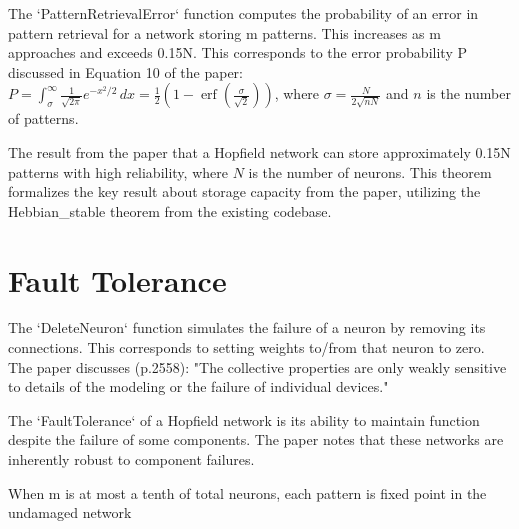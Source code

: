 \begin{definition}\label{PatternRetrievalError}
\leanok
The `PatternRetrievalError` function computes the probability of an error in pattern retrieval
for a network storing m patterns. This increases as m approaches and exceeds 0.15N.
This corresponds to the error probability P discussed in Equation 10 of the paper:
\( P = \int_{\sigma}^{\infty} \frac{1}{\sqrt{2\pi}} e^{-x^2 / 2} \, 
dx = \frac{1}{2} \left(1 - \operatorname{erf}\left(\frac{\sigma}{\sqrt{2}}\right)\right) \),
 where \( \sigma = \frac{N}{2\sqrt{nN}} \) and \( n \) is the number of patterns.

\end{definition}

\begin{theorem}\label{storage_capacity_bound}
\leanok
The result from the paper that a Hopfield network can store approximately 0.15N patterns
with high reliability, where $N$ is the number of neurons. This theorem formalizes the
 key result about storage capacity from the paper,
utilizing the Hebbian\_stable theorem from the existing codebase.
\end{theorem}


\section{Fault Tolerance}

\begin{definition}\label{DeleteNeuron}
\leanok
The `DeleteNeuron` function simulates the failure of a neuron by removing its connections.
This corresponds to setting weights to/from that neuron to zero.
The paper discusses (p.2558): "The collective properties are only weakly sensitive to
details of the modeling or the failure of individual devices."
\end{definition}

\begin{definition}\label{FaultTolerance}
\leanok
The `FaultTolerance` of a Hopfield network is its ability to maintain function 
despite the failure of some components. The paper notes that these networks are 
inherently robust to component failures.
\end{definition}


\begin{definition}\label{pattern_stability_in_hebbian}
\leanok
When m is at most a tenth of total neurons, each pattern is fixed point in the undamaged network
\end{definition}


